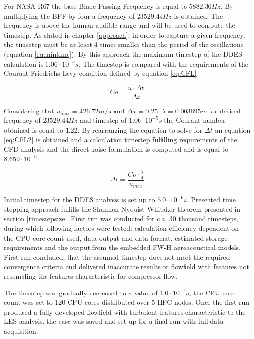 For NASA R67 the base Blade Passing Frequency is equal to $5882.36 Hz$. By multiplying the BPF by four a frequency of $23529.44 Hz$ is obtained. The frequency is above the human audible range and will be used to compute the timestep. As stated in chapter \ref{approach}, in order to capture a given frequency, the timestep must be at least 4 times smaller than the period of the oscillations (equation \ref{eq:mintime}). By this approach the maximum timestep of the DDES calculation is $1.06 \cdot 10^{-5}s$. The timestep is compared with the requirements of the Courant-Friedrichs-Levy condition defined by equation \ref{eq:CFL}

\begin{equation} \label{eq:CFL}
Co = \frac{u \cdot \Delta t}{\Delta x}
\end{equation}

Considering that $u_{max} = 426.72 m/s$ and $\Delta x = 0.25 \cdot \lambda = 0.003695 m$ for desired frequency of $23529.44 Hz$ and timestep of  $1.06 \cdot 10^{-5}s$ the Courant number obtained is equal to 1.22. By rearranging the equation to solve for $\Delta t$ an equation \ref{eq:CFL2} is obtained and a calculation timestep fulfilling requirements of the CFD analysis and the direct noise formulation is computed and is equal to $8.659 \cdot 10^{-6}$.

\begin{equation} \label{eq:CFL2}
\Delta t = \frac{Co \cdot \frac{\lambda}{4}}{u_{max}}
\end{equation}

Initial timestep for the DDES analysis is set up to $5.0 \cdot 10^{-6}s$. Presented time stepping approach fulfills the Shannon-Nyquist-Whitaker theorem presented in section \ref{timestepsize}. First run was conducted for c.a. 30 thousand timesteps, during which following factors were tested: calculation efficiency dependent on the CPU core count used, data output and data format, estimated storage requirements and the output from the embedded FW-H aeroacoustical models. First run concluded, that the assumed timestep does not meet the required convergence criteria and delivered inaccurate results or flowfield with features not resembling the features characteristic for compressor flow.

The timestep was gradually decreased to a value of $1.0 \cdot 10^{-6}s$, the CPU core count was set to 120 CPU cores distributed over 5 HPC nodes. Once the first run produced a fully developed flowfield with turbulent features characteristic to the LES analysis, the case was saved and set up for a final run with full data acquisition. 

